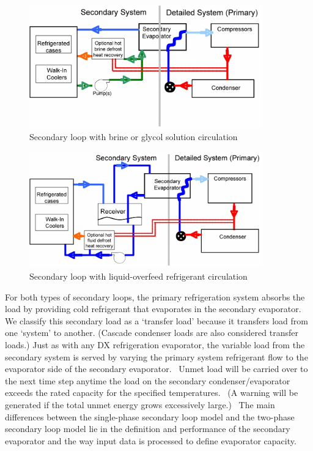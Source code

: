 \begin{figure}[hbtp] %
\centering
\includegraphics[width=0.9\textwidth, height=0.9\textheight, keepaspectratio=true]{media/image6323.png}
\caption{Secondary loop with brine or glycol solution circulation \protect \label{fig:secondary-loop-with-brine-or-glycol-solution}}
\end{figure}

\begin{figure}[hbtp] %
\centering
\includegraphics[width=0.9\textwidth, height=0.9\textheight, keepaspectratio=true]{media/image6324.png}
\caption{Secondary loop with liquid-overfeed refrigerant circulation \protect \label{fig:secondary-loop-with-liquid-overfeed}}
\end{figure}

For both types of secondary loops, the primary refrigeration system absorbs the load by providing cold refrigerant that evaporates in the secondary evaporator.~ We classify this secondary load as a `transfer load' because it transfers load from one `system' to another. (Cascade condenser loads are also considered transfer loads.) Just as with any DX refrigeration evaporator, the variable load from the secondary system is served by varying the primary system refrigerant flow to the evaporator side of the secondary evaporator.~ Unmet load will be carried over to the next time step anytime the load on the secondary condenser/evaporator exceeds the rated capacity for the specified temperatures.~ (A warning will be generated if the total unmet energy grows excessively large.) ~The main differences between the single-phase secondary loop model and the two-phase secondary loop model lie in the definition and performance of the secondary evaporator and the way input data is processed to define evaporator capacity.


